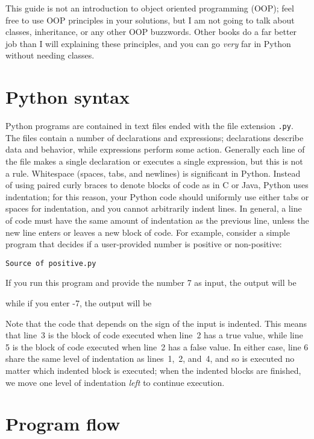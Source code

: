 \documentclass{article}
\newcommand{\example}[1]{%
  \par
  \vspace{.5em}
  \noindent \texttt{Source of #1}
  
  \vspace{.5em}
}
\newcommand{\exampleoutput}[1]{%
  \par
  \vspace{.5em}
  
  \vspace{.5em}
}
\begin{document}
This guide is not an introduction to object oriented programming
(OOP); feel free to use OOP principles in your solutions, but I am not
going to talk about classes, inheritance, or any other OOP
buzzwords. Other books do a far better job than I will explaining
these principles, and you can go \textit{very} far in Python without
needing classes.

\section{Python syntax}
\label{sec:syntax}

Python programs are contained in text files ended with the file
extension \texttt{.py}. The files contain a number of declarations and
expressions; declarations describe data and behavior, while
expressions perform some action. Generally each line of the file makes
a single declaration or executes a single expression, but this is not
a rule. Whitespace (spaces, tabs, and newlines) is significant in
Python. Instead of using paired curly braces to denote blocks of code
as in C or Java, Python uses indentation; for this reason, your Python
code should uniformly use either tabs or spaces for indentation, and
you cannot arbitrarily indent lines. In general, a line of code must
have the same amount of indentation as the previous line, unless the
new line enters or leaves a new block of code. For example, consider a
simple program that decides if a user-provided number is positive or
non-positive:
\example{positive.py}
If you run this program and provide the number 7 as input, the output
will be
\exampleoutput{positive-pos.out}
while if you enter -7, the output will be
\exampleoutput{positive-neg.out}
Note that the code that depends on the sign of the input is
indented. This means that line~3 is the block of code executed when
line~2 has a true value, while line 5 is the block of code
executed when line~2 has a false value. In either case, line 6 share
the same level of indentation as lines~1,~2, and~4, and so is executed
no matter which indented block is executed; when the indented blocks
are finished, we move one level of indentation \textit{left} to
continue execution.

\section{Program flow}
\label{sec:flow}
\end{document}

